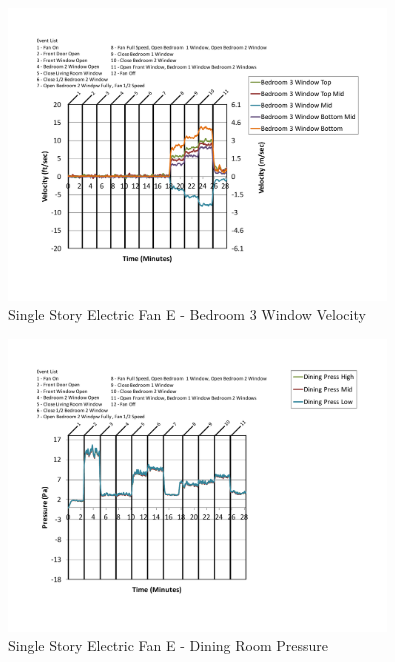 \documentclass{article}
\begin{document}
\begin{appendices}
	\begin{figure}[H]
		\centering
		\includegraphics[height=3.05in,trim=0.67in 1.1in 0.67in 0.8in,clip=true]{0_Images/Results_Charts/ColdFlow/Single_Story/Electric/E/Bedroom_3_Window_Velocity.pdf}
		\caption{Single Story Electric Fan E - Bedroom 3 Window Velocity}
	\end{figure}
 

	\begin{figure}[H]
		\centering
		\includegraphics[height=3.05in,trim=0.67in 1.1in 0.67in 0.8in,clip=true]{0_Images/Results_Charts/ColdFlow/Single_Story/Electric/E/Dining_Room_Pressure.pdf}
		\caption{Single Story Electric Fan E - Dining Room Pressure}
	\end{figure}
 
	\clearpage


\end{appendices}
\end{document}
